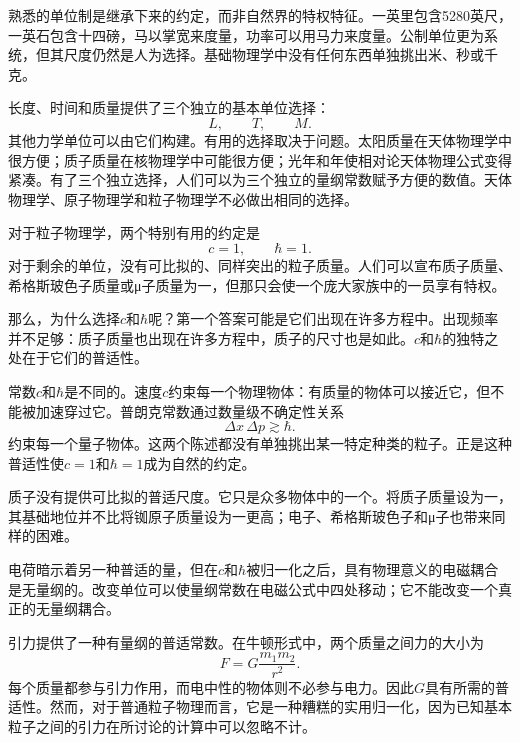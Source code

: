 熟悉的单位制是继承下来的约定，而非自然界的特权特征。一英里包含5280英尺，一英石包含十四磅，马以掌宽来度量，功率可以用马力来度量。公制单位更为系统，但其尺度仍然是人为选择。基础物理学中没有任何东西单独挑出米、秒或千克。

长度、时间和质量提供了三个独立的基本单位选择：
\begin{equation}
L,\qquad T,\qquad M.
\end{equation}
其他力学单位可以由它们构建。有用的选择取决于问题。太阳质量在天体物理学中很方便；质子质量在核物理学中可能很方便；光年和年使相对论天体物理公式变得紧凑。有了三个独立选择，人们可以为三个独立的量纲常数赋予方便的数值。天体物理学、原子物理学和粒子物理学不必做出相同的选择。

对于粒子物理学，两个特别有用的约定是
\begin{equation}
c=1,
\qquad
\hbar=1.
\end{equation}
对于剩余的单位，没有可比拟的、同样突出的粒子质量。人们可以宣布质子质量、希格斯玻色子质量或{\proseunicodefont μ}子质量为一，但那只会使一个庞大家族中的一员享有特权。

那么，为什么选择\(c\)和\(\hbar\)呢？第一个答案可能是它们出现在许多方程中。出现频率并不足够：质子质量也出现在许多方程中，质子的尺寸也是如此。\(c\)和\(\hbar\)的独特之处在于它们的普适性。

常数\(c\)和\(\hbar\)是不同的。速度\(c\)约束每一个物理物体：有质量的物体可以接近它，但不能被加速穿过它。普朗克常数通过数量级不确定性关系
\begin{equation}
\Delta x\,\Delta p\gtrsim\hbar.
\end{equation}
约束每一个量子物体。这两个陈述都没有单独挑出某一特定种类的粒子。正是这种普适性使\(c=1\)和\(\hbar=1\)成为自然的约定。

质子没有提供可比拟的普适尺度。它只是众多物体中的一个。将质子质量设为一，其基础地位并不比将铷原子质量设为一更高；电子、希格斯玻色子和{\proseunicodefont μ}子也带来同样的困难。

电荷暗示着另一种普适的量，但在\(c\)和\(\hbar\)被归一化之后，具有物理意义的电磁耦合是无量纲的。改变单位可以使量纲常数在电磁公式中四处移动；它不能改变一个真正的无量纲耦合。

引力提供了一种有量纲的普适常数。在牛顿形式中，两个质量之间力的大小为
\begin{equation}
F=G\frac{m_1m_2}{r^2}.
\end{equation}
每个质量都参与引力作用，而电中性的物体则不必参与电力。因此\(G\)具有所需的普适性。然而，对于普通粒子物理而言，它是一种糟糕的实用归一化，因为已知基本粒子之间的引力在所讨论的计算中可以忽略不计。

